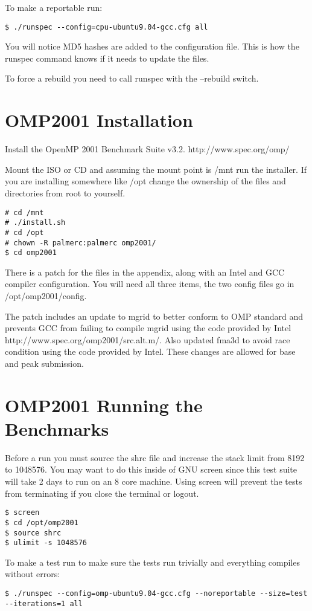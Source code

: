 \documentclass[12pt,twoside,a4paper]{article}
\begin{document}
To make a reportable run:
\begin{lstlisting}
$ ./runspec --config=cpu-ubuntu9.04-gcc.cfg all
\end{lstlisting}

You will notice MD5 hashes are added to the configuration file. This is how the runspec command knows if it needs to update the files.

To force a rebuild you need to call runspec with the --rebuild switch.

\section{OMP2001 Installation}
Install the OpenMP 2001 Benchmark Suite v3.2. http://www.spec.org/omp/

Mount the ISO or CD and assuming the mount point is /mnt run the installer. If you are installing somewhere like /opt change the ownership of the files and directories from root to yourself.

\begin{lstlisting}
# cd /mnt
# ./install.sh
# cd /opt
# chown -R palmerc:palmerc omp2001/
$ cd omp2001
\end{lstlisting}

There is a patch for the files in the appendix, along with an Intel and GCC compiler configuration. You will need all three items, the two config files go in /opt/omp2001/config.

The patch includes an update to mgrid to better conform to OMP standard and prevents GCC from failing to compile mgrid using the code provided by Intel http://www.spec.org/omp2001/src.alt.m/. Also updated fma3d to avoid race condition using the code provided by Intel. These changes are allowed for base and peak submission.

\section{OMP2001 Running the Benchmarks}
Before a run you must source the shrc file and increase the stack limit from 8192 to 1048576. You may want to do this inside of GNU screen since this test suite will
take 2 days to run on an 8 core machine. Using screen will prevent the tests from terminating if you close the terminal or logout.
\begin{lstlisting}
$ screen
$ cd /opt/omp2001
$ source shrc
$ ulimit -s 1048576
\end{lstlisting}

To make a test run to make sure the tests run trivially and everything compiles without errors:
\begin{lstlisting}
$ ./runspec --config=omp-ubuntu9.04-gcc.cfg --noreportable --size=test --iterations=1 all
\end{lstlisting}
\end{document}
